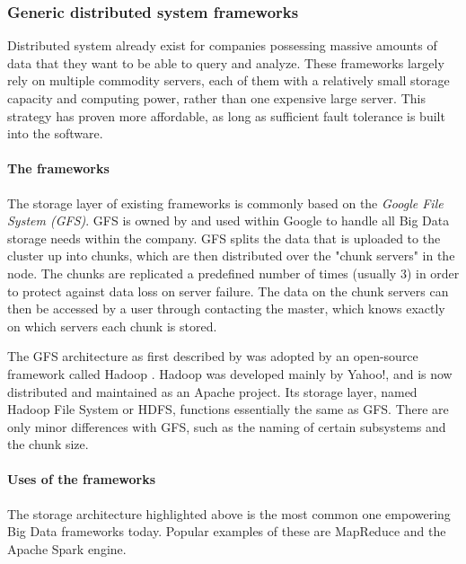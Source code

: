 \subsubsection{Generic distributed system frameworks}
Distributed system already exist for companies possessing massive amounts of data that they want to be able to query and analyze. These frameworks largely rely on multiple commodity servers, each of them with a relatively small storage capacity and computing power, rather than one expensive large server. This strategy has proven more affordable, as long as sufficient fault tolerance is built into the software.

\paragraph{The frameworks}
The storage layer of existing frameworks is commonly based on the \textit{Google File System (GFS)}\cite{Ghem03}. GFS is owned by and used within Google to handle all Big Data storage needs within the company. GFS splits the data that is uploaded to the cluster up into chunks, which are then distributed over the "chunk servers" in the node. The chunks are replicated a predefined number of times (usually 3) in order to protect against data loss on server failure. The data on the chunk servers can then be accessed by a user through contacting the master, which knows exactly on which servers each chunk is stored.\cite{Ghem03} %

The GFS architecture as first described by \citep{Ghem03} was adopted by an open-source framework called Hadoop \cite{Shv10}. Hadoop was developed mainly by Yahoo!, and is now distributed and maintained as an Apache project. Its storage layer, named Hadoop File System or HDFS, functions essentially the same as GFS. There are only minor differences with GFS, such as the naming of certain subsystems and the chunk size. %

\paragraph{Uses of the frameworks}
The storage architecture highlighted above is the most common one empowering Big Data frameworks today. Popular examples of these are MapReduce and the Apache Spark engine.

